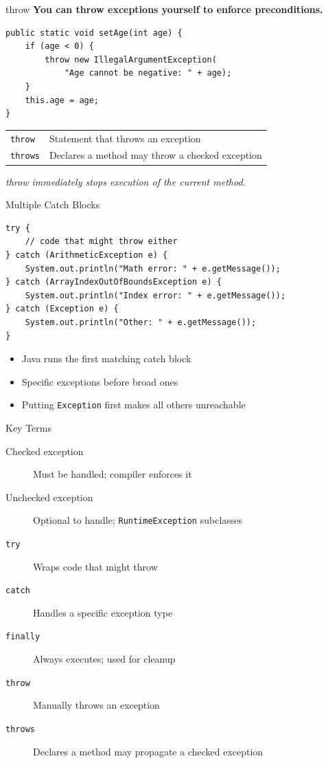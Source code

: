 \documentclass{beamer}
\begin{document}
\begin{frame}[fragile]{throw}
\textbf{You can throw exceptions yourself to enforce preconditions.}
\begin{lstlisting}
public static void setAge(int age) {
    if (age < 0) {
        throw new IllegalArgumentException(
            "Age cannot be negative: " + age);
    }
    this.age = age;
}
\end{lstlisting}
\vspace{0.3cm}
\begin{tabular}{ll}
\texttt{throw} & Statement that throws an exception \\
\texttt{throws} & Declares a method may throw a checked exception \\
\end{tabular}
\vspace{0.3cm}
\textit{throw immediately stops execution of the current method.}
\end{frame}
\begin{frame}[fragile]{Multiple Catch Blocks}
\begin{lstlisting}
try {
    // code that might throw either
} catch (ArithmeticException e) {
    System.out.println("Math error: " + e.getMessage());
} catch (ArrayIndexOutOfBoundsException e) {
    System.out.println("Index error: " + e.getMessage());
} catch (Exception e) {
    System.out.println("Other: " + e.getMessage());
}
\end{lstlisting}
\vspace{0.3cm}
\begin{itemize}
  \item Java runs the first matching catch block
  \item Specific exceptions before broad ones
  \item Putting \texttt{Exception} first makes all others unreachable
\end{itemize}
\end{frame}
\begin{frame}{Key Terms}
\begin{description}
  \item[Checked exception] Must be handled; compiler enforces it
  \item[Unchecked exception] Optional to handle; \texttt{RuntimeException} subclasses
  \item[\texttt{try}] Wraps code that might throw
  \item[\texttt{catch}] Handles a specific exception type
  \item[\texttt{finally}] Always executes; used for cleanup
  \item[\texttt{throw}] Manually throws an exception
  \item[\texttt{throws}] Declares a method may propagate a checked exception
\end{description}
\end{frame}
\end{document}
